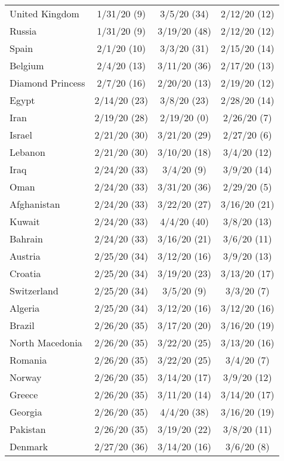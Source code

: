\begin{table}[h]
\begin{longtable}{p{} c c c}
United Kingdom & 1/31/20 (9)  & 3/5/20 (34)  & 2/12/20 (12) \\
Russia & 1/31/20 (9)  & 3/19/20 (48)  & 2/12/20 (12) \\
\hline 
Spain & 2/1/20 (10)  & 3/3/20 (31)  & 2/15/20 (14) \\
\hline 
Belgium & 2/4/20 (13)  & 3/11/20 (36)  & 2/17/20 (13) \\
\hline 
Diamond Princess & 2/7/20 (16)  & 2/20/20 (13)  & 2/19/20 (12) \\
\hline 
Egypt & 2/14/20 (23)  & 3/8/20 (23)  & 2/28/20 (14) \\
\hline 
Iran & 2/19/20 (28)  & 2/19/20 (0)  & 2/26/20 (7) \\
\hline 
Israel & 2/21/20 (30)  & 3/21/20 (29)  & 2/27/20 (6) \\
Lebanon & 2/21/20 (30)  & 3/10/20 (18)  & 3/4/20 (12) \\
\hline 
Iraq & 2/24/20 (33)  & 3/4/20 (9)  & 3/9/20 (14) \\
Oman & 2/24/20 (33)  & 3/31/20 (36)  & 2/29/20 (5) \\
Afghanistan & 2/24/20 (33)  & 3/22/20 (27)  & 3/16/20 (21) \\
Kuwait & 2/24/20 (33)  & 4/4/20 (40)  & 3/8/20 (13) \\
Bahrain & 2/24/20 (33)  & 3/16/20 (21)  & 3/6/20 (11) \\
\hline 
Austria & 2/25/20 (34)  & 3/12/20 (16)  & 3/9/20 (13) \\
Croatia & 2/25/20 (34)  & 3/19/20 (23)  & 3/13/20 (17) \\
Switzerland & 2/25/20 (34)  & 3/5/20 (9)  & 3/3/20 (7) \\
Algeria & 2/25/20 (34)  & 3/12/20 (16)  & 3/12/20 (16) \\
\hline 
Brazil & 2/26/20 (35)  & 3/17/20 (20)  & 3/16/20 (19) \\
North Macedonia & 2/26/20 (35)  & 3/22/20 (25)  & 3/13/20 (16) \\
Romania & 2/26/20 (35)  & 3/22/20 (25)  & 3/4/20 (7) \\
Norway & 2/26/20 (35)  & 3/14/20 (17)  & 3/9/20 (12) \\
Greece & 2/26/20 (35)  & 3/11/20 (14)  & 3/14/20 (17) \\
Georgia & 2/26/20 (35)  & 4/4/20 (38)  & 3/16/20 (19) \\
Pakistan & 2/26/20 (35)  & 3/19/20 (22)  & 3/8/20 (11) \\
\hline 
Denmark & 2/27/20 (36)  & 3/14/20 (16)  & 3/6/20 (8) \\

\end{longtable}
\end{table}
